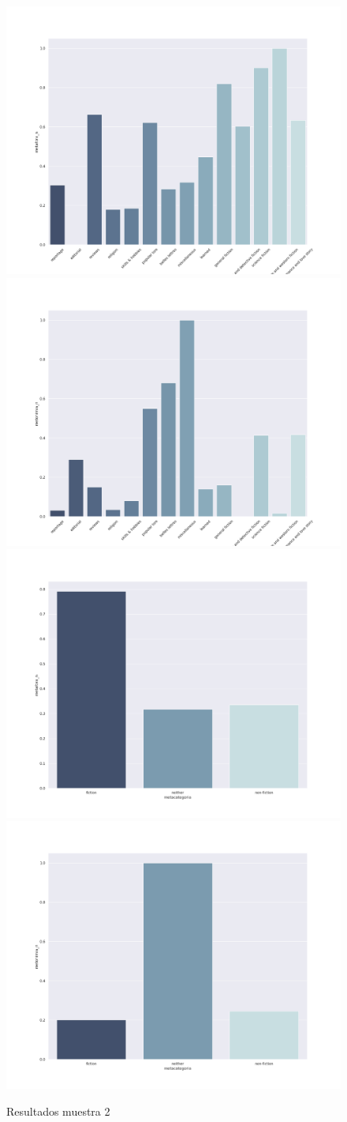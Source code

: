 \documentclass[12pt,letterpaper,twoside]{article}
\begin{document}
\begin{figure}[H]
\centering
\includegraphics[width=.45\linewidth]{./resultados/graphs/muestra/c2_metafora.png}
\includegraphics[width=.45\linewidth]{./resultados/graphs/muestra/c2_metonimia.png}
\includegraphics[width=.45\linewidth]{./resultados/graphs/meta/c2_metacategoria_metafora.png}
\includegraphics[width=.45\linewidth]{./resultados/graphs/meta/c2_metacategoria_metonimia.png}
\caption{\label{fig:c2_resultados}Resultados muestra 2}
\end{figure}
\end{document}
